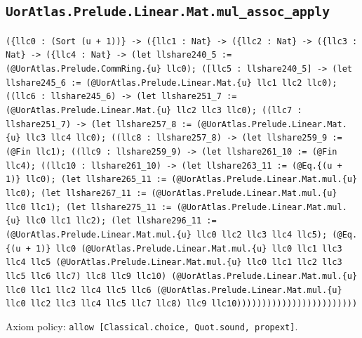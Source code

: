 \documentclass[11pt]{article}
\begin{document}
\subsection*{\texttt{UorAtlas.Prelude.Linear.Mat.mul\_assoc\_apply}}
\noindent\texttt{(\{llc0 : (Sort (u + 1))\} -> (\{llc1 : Nat\} -> (\{llc2 : Nat\} -> (\{llc3 : Nat\} -> (\{llc4 : Nat\} -> (let llshare240\_5 := (@UorAtlas.Prelude.CommRing.\{u\} llc0); ([llc5 : llshare240\_5] -> (let llshare245\_6 := (@UorAtlas.Prelude.Linear.Mat.\{u\} llc1 llc2 llc0); ((llc6 : llshare245\_6) -> (let llshare251\_7 := (@UorAtlas.Prelude.Linear.Mat.\{u\} llc2 llc3 llc0); ((llc7 : llshare251\_7) -> (let llshare257\_8 := (@UorAtlas.Prelude.Linear.Mat.\{u\} llc3 llc4 llc0); ((llc8 : llshare257\_8) -> (let llshare259\_9 := (@Fin llc1); ((llc9 : llshare259\_9) -> (let llshare261\_10 := (@Fin llc4); ((llc10 : llshare261\_10) -> (let llshare263\_11 := (@Eq.\{(u + 1)\} llc0); (let llshare265\_11 := (@UorAtlas.Prelude.Linear.Mat.mul.\{u\} llc0); (let llshare267\_11 := (@UorAtlas.Prelude.Linear.Mat.mul.\{u\} llc0 llc1); (let llshare275\_11 := (@UorAtlas.Prelude.Linear.Mat.mul.\{u\} llc0 llc1 llc2); (let llshare296\_11 := (@UorAtlas.Prelude.Linear.Mat.mul.\{u\} llc0 llc2 llc3 llc4 llc5); (@Eq.\{(u + 1)\} llc0 (@UorAtlas.Prelude.Linear.Mat.mul.\{u\} llc0 llc1 llc3 llc4 llc5 (@UorAtlas.Prelude.Linear.Mat.mul.\{u\} llc0 llc1 llc2 llc3 llc5 llc6 llc7) llc8 llc9 llc10) (@UorAtlas.Prelude.Linear.Mat.mul.\{u\} llc0 llc1 llc2 llc4 llc5 llc6 (@UorAtlas.Prelude.Linear.Mat.mul.\{u\} llc0 llc2 llc3 llc4 llc5 llc7 llc8) llc9 llc10))))))))))))))))))))))))}\par
\noindent Axiom policy: \texttt{allow [Classical.choice, Quot.sound, propext]}.\par
\end{document}
